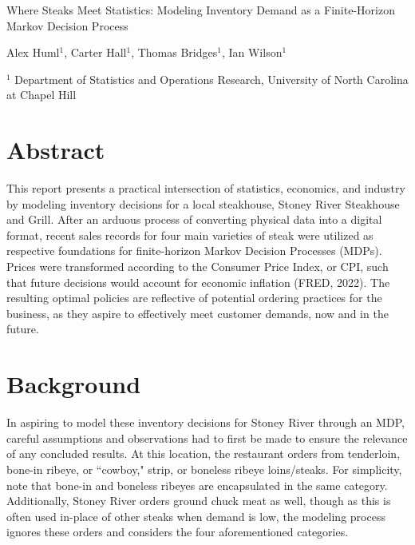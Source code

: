 \documentclass[12pt,a4paper]{article}
\begin{document}
\Large
\begin{center}
Where Steaks Meet Statistics: Modeling Inventory Demand as a Finite-Horizon Markov Decision Process
\hspace{20pt}

\large
Alex Huml$^1$, Carter Hall$^1$, Thomas Bridges$^1$, Ian Wilson$^1$\\

\hspace{10pt}

\small  
$^1$ Department of Statistics and Operations Research, University of North Carolina at Chapel Hill\\

\end{center}

\hrulefill
\normalsize

\section{Abstract}

This report presents a practical intersection of statistics, economics, and industry by modeling inventory decisions for a local steakhouse, Stoney River Steakhouse and Grill. After an arduous process of converting physical data into a digital format, recent sales records for four main varieties of steak were utilized as respective foundations for finite-horizon Markov Decision Processes (MDPs). Prices were transformed according to the Consumer Price Index, or CPI, such that future decisions would account for economic inflation (FRED, 2022). The resulting optimal policies are reflective of potential ordering practices for the business, as they aspire to effectively meet customer demands, now and in the future.

\section{Background}

In aspiring to model these inventory decisions for Stoney River through an MDP, careful assumptions and observations had to first be made to ensure the relevance of any concluded results. At this location, the restaurant orders from tenderloin, bone-in ribeye, or ``cowboy," strip, or boneless ribeye loins/steaks. For simplicity, note that bone-in and boneless ribeyes are encapsulated in the same category. Additionally, Stoney River orders ground chuck meat as well, though as this is often used in-place of other steaks when demand is low, the modeling process ignores these orders and considers the four aforementioned categories.
\\
\end{document}
